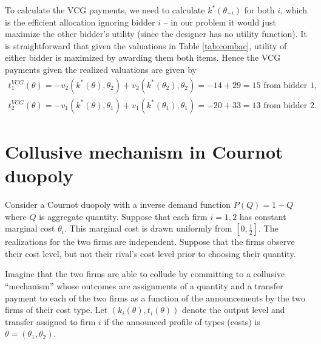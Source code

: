 \documentclass[a4paper]{article}
\begin{document}
To calculate the VCG payments, we need to calculate $k^*(\theta_{-i})$ for both $i$, which is the efficient allocation ignoring bidder $i$ -- in our problem it would just maximize the other bidder's utility (since the designer has no utility function). It is straightforward that given the valuations in Table \ref{tab:combac}, utility of either bidder is maximized by awarding them both items. Hence the VCG payments given the realized valuations are given by
\begin{align*}
	t_1^{VCG}(\theta) = -v_2(k^*(\theta),\theta_2) + v_2(k^*(\theta_2),\theta_2) = -14+29 = 15 \text{ from bidder 1,}
	\\
	t_2^{VCG}(\theta) = -v_1(k^*(\theta),\theta_1) + v_1(k^*(\theta_1),\theta_1) = -20+33 = 13 \text{ from bidder 2.}
\end{align*}
\fi 



\section{Collusive mechanism in Cournot duopoly}
Consider a Cournot duopoly with a inverse demand function $P(Q)=1-Q$ where $Q$ is aggregate quantity. Suppose that each firm $i=1,2$ has constant marginal cost $\theta_i$. This marginal cost is drawn uniformly from $[0,\frac{1}{2}]$. The realizations for the two firms are independent. Suppose that the firms observe their cost level, but not their rival’s cost level prior to choosing their quantity.  

\smallskip
Imagine that the two firms are able to collude by committing to a collusive “mechanism” whose outcomes are assignments of a quantity and a transfer payment to each of the two firms as a function of the announcements by the two firms of their cost type.  Let $(k_i(\theta),t_i(\theta))$ denote the output level and transfer assigned to firm $i$ if the announced profile of types (costs) is $\theta = (\theta_1, \theta_2)$.
\end{document}
